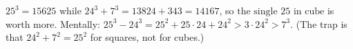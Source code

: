 $25^3=15625$ while $24^3+7^3=13824+343=14167$, so $\boxed{\text{the single }25\text{ in cube}}$ is worth more. Mentally: $25^3-24^3=25^2+25\cdot24+24^2>3\cdot24^2>7^3$. (The trap is that $24^2+7^2=25^2$ for squares, not for cubes.)
